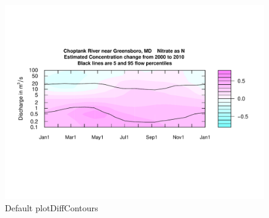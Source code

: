 \documentclass[a4paper,11pt]{article}
\begin{document}
\begin{figure}[ht]
\begin{center}

\includegraphics{EGRET-figplotDiffContours}
\end{center}
\caption{Default plotDiffContours}
\label{fig:plotDiffContours}
\end{figure}
\end{document}
